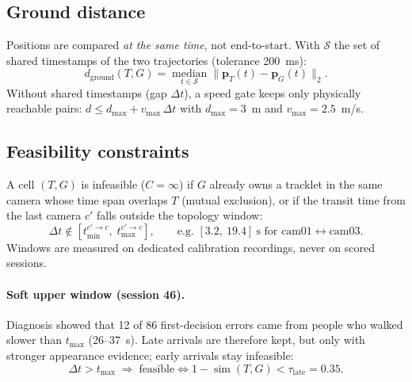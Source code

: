 \documentclass[11pt,a4paper]{article}
\newcommand{\simf}{\operatorname{sim}}
\begin{document}
\subsection{Ground distance}
Positions are compared \emph{at the same time}, not end-to-start. With $\mathcal S$ the set
of shared timestamps of the two trajectories (tolerance 200~ms):
\begin{equation}
  d_{\text{ground}}(T,G) = \operatorname*{median}_{t \in \mathcal S}
  \bigl\lVert \mathbf p_T(t) - \mathbf p_G(t) \bigr\rVert_2 .
\end{equation}
Without shared timestamps (gap $\Delta t$), a speed gate keeps only physically reachable pairs:
$d \leq d_{\max} + v_{\max}\,\Delta t$ with $d_{\max} = 3$~m and $v_{\max} = 2.5$~m/s.

\subsection{Feasibility constraints}
A cell $(T,G)$ is infeasible ($C=\infty$) if $G$ already owns a tracklet in the same camera
whose time span overlaps $T$ (mutual exclusion), or if the transit time from the last camera
$c'$ falls outside the topology window:
\begin{equation}
  \Delta t \notin \left[t_{\min}^{c' \to c},\; t_{\max}^{c' \to c}\right],
  \qquad \text{e.g.\ } [3.2,\ 19.4]~\text{s for cam01} \leftrightarrow \text{cam03}.
\end{equation}
Windows are measured on dedicated calibration recordings, never on scored sessions.

\paragraph{Soft upper window (session 46).} Diagnosis showed that 12 of 86 first-decision
errors came from people who walked slower than $t_{\max}$ (26--37~s). Late arrivals are
therefore kept, but only with stronger appearance evidence; early arrivals stay infeasible:
\begin{equation}
  \Delta t > t_{\max} \;\Longrightarrow\; \text{feasible} \iff 1 - \simf(T,G) < \tau_{\text{late}} = 0.35 .
\end{equation}
\end{document}
